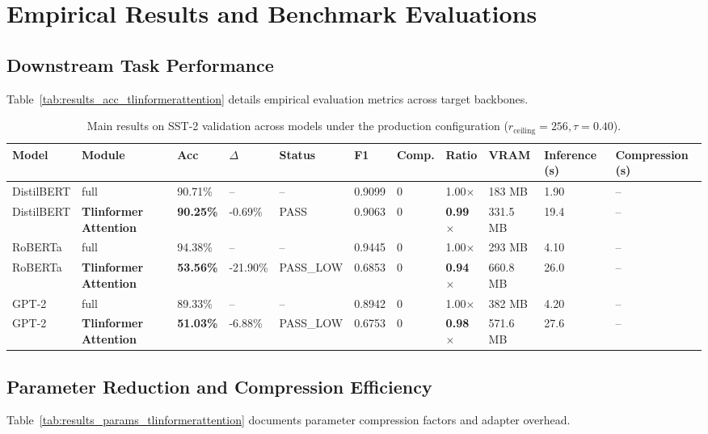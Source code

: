 \section{Empirical Results and Benchmark Evaluations}

\subsection{Downstream Task Performance}
Table~\ref{tab:results_acc_tlinformerattention} details empirical evaluation metrics across target backbones.

\begin{table}[t]
\centering
\small
\begin{tabular}{lllllllllll}
\toprule
\textbf{Model} & \textbf{Module} & \textbf{Acc} & \textbf{$\Delta$} & \textbf{Status} & \textbf{F1} & \textbf{Comp.} & \textbf{Ratio} & \textbf{VRAM} & \textbf{Inference (s)} & \textbf{Compression (s)} \\
\midrule
DistilBERT & full & 90.71\% & -- & -- & 0.9099 & 0 & 1.00$\times$ & 183 MB & 1.90 & -- \\
DistilBERT & \textbf{Tlinformer Attention} & \textbf{90.25\%} & -0.69\% & PASS & 0.9063 & 0 & \textbf{0.99$\times$} & 331.5 MB & 19.4 & -- \\
RoBERTa & full & 94.38\% & -- & -- & 0.9445 & 0 & 1.00$\times$ & 293 MB & 4.10 & -- \\
RoBERTa & \textbf{Tlinformer Attention} & \textbf{53.56\%} & -21.90\% & PASS\_LOW & 0.6853 & 0 & \textbf{0.94$\times$} & 660.8 MB & 26.0 & -- \\
GPT-2 & full & 89.33\% & -- & -- & 0.8942 & 0 & 1.00$\times$ & 382 MB & 4.20 & -- \\
GPT-2 & \textbf{Tlinformer Attention} & \textbf{51.03\%} & -6.88\% & PASS\_LOW & 0.6753 & 0 & \textbf{0.98$\times$} & 571.6 MB & 27.6 & -- \\
\bottomrule
\end{tabular}
\caption{Main results on SST-2 validation across models under the production configuration ($r_{\mathrm{ceiling}}=256, \tau=0.40$).}
\label{tab:main_sst2}
\end{table}

\subsection{Parameter Reduction and Compression Efficiency}
Table~\ref{tab:results_params_tlinformerattention} documents parameter compression factors and adapter overhead.

